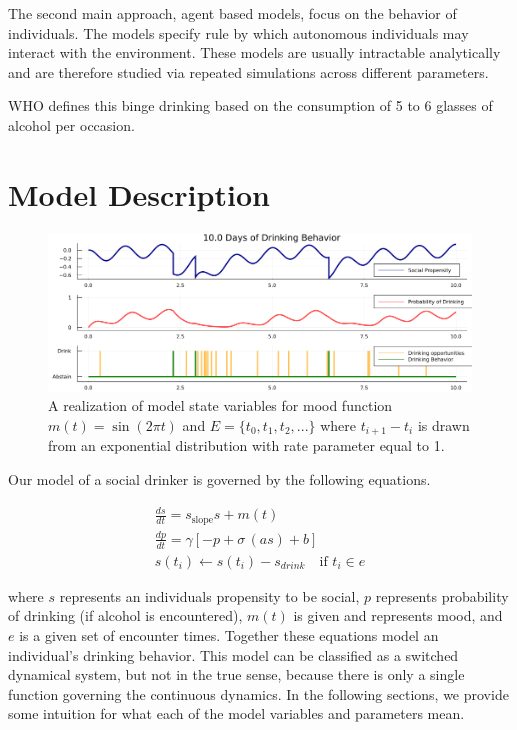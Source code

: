 \documentclass{journal}
\theoremstyle{definition}
\begin{document}
The second main approach, agent based models, focus on the behavior of individuals. The models specify rule by which autonomous individuals may interact with the environment. These models are usually intractable analytically and are therefore studied via repeated simulations across different parameters.

WHO defines this binge drinking based on the consumption of 5 to 6 glasses of alcohol per occasion.

\section*{Model Description}
\begin{figure}[h] \label{fig:nonuniform_person}
\includegraphics[width=\textwidth]{nonuniform_person.png}
\caption{A realization of model state variables for mood function $m(t) = \sin(2\pi t)$ and $E = \{ t_0, t_1, t_2, ...\}$ where $t_{i+1} - t_i$ is drawn from an exponential distribution with rate parameter equal to 1.}
\end{figure}
Our model of a social drinker is governed by the following equations. 

\begin{align}
\frac{ds}{dt} = s_{\text{slope}}s + m(t)  \\
\frac{dp}{dt}  = \gamma[-p + \sigma\,(a s) + b] \\
s(t_i) \leftarrow s(t_i) - s_{drink} \quad \text{if } t_i \in e 
\end{align}

where $s$ represents an individuals propensity to be social, $p$ represents probability of drinking (if alcohol is encountered), $m(t)$ is given and represents mood, and $e$ is a given set of encounter times. Together these equations model an individual's drinking behavior. This model can be classified as a switched dynamical system, but not in the true sense, because there is only a single function governing the continuous dynamics. In the following sections, we provide some intuition for what each of the model variables and parameters mean.
\end{document}
